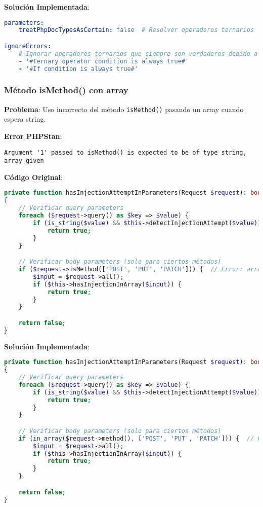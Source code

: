 \documentclass[12pt,a4paper]{article}
\begin{document}
\textbf{Solución Implementada}:
\begin{lstlisting}[language=yaml, caption=Configuración en phpstan.neon]
parameters:
    treatPhpDocTypesAsCertain: false  # Resolver operadores ternarios

ignoreErrors:
    # Ignorar operadores ternarios que siempre son verdaderos debido a PHPDoc
    - '#Ternary operator condition is always true#'
    - '#If condition is always true#'
\end{lstlisting}

\subsubsection{Método isMethod() con array}

\textbf{Problema}: Uso incorrecto del método \texttt{isMethod()} pasando un array cuando espera string.

\textbf{Error PHPStan}:
\begin{lstlisting}[caption=Error en SecurityValidator.php]
Argument '1' passed to isMethod() is expected to be of type string, array given
\end{lstlisting}

\textbf{Código Original}:
\begin{lstlisting}[language=php, caption=SecurityValidator.php - Uso incorrecto de isMethod()]
private function hasInjectionAttemptInParameters(Request $request): bool
{
    // Verificar query parameters
    foreach ($request->query() as $key => $value) {
        if (is_string($value) && $this->detectInjectionAttempt($value)) {
            return true;
        }
    }

    // Verificar body parameters (solo para ciertos métodos)
    if ($request->isMethod(['POST', 'PUT', 'PATCH'])) {  // Error: array en lugar de string
        $input = $request->all();
        if ($this->hasInjectionInArray($input)) {
            return true;
        }
    }

    return false;
}
\end{lstlisting}

\textbf{Solución Implementada}:
\begin{lstlisting}[language=php, caption=SecurityValidator.php - Corrección del método]
private function hasInjectionAttemptInParameters(Request $request): bool
{
    // Verificar query parameters
    foreach ($request->query() as $key => $value) {
        if (is_string($value) && $this->detectInjectionAttempt($value)) {
            return true;
        }
    }

    // Verificar body parameters (solo para ciertos métodos)
    if (in_array($request->method(), ['POST', 'PUT', 'PATCH'])) {  // Corrección
        $input = $request->all();
        if ($this->hasInjectionInArray($input)) {
            return true;
        }
    }

    return false;
}
\end{lstlisting}
\end{document}
